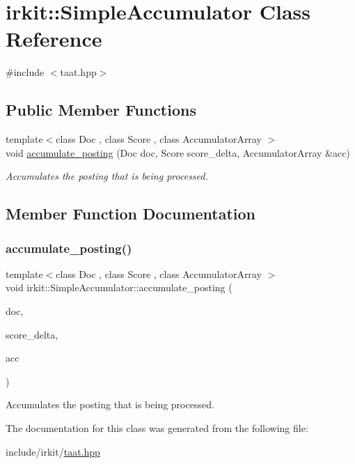 \hypertarget{classirkit_1_1SimpleAccumulator}{}\section{irkit\+:\+:Simple\+Accumulator Class Reference}
\label{classirkit_1_1SimpleAccumulator}


{\ttfamily \#include $<$taat.\+hpp$>$}

\subsection*{Public Member Functions}
\begin{DoxyCompactItemize}
\item 
{\footnotesize template$<$class Doc , class Score , class Accumulator\+Array $>$ }\\void \mbox{\hyperlink{classirkit_1_1SimpleAccumulator_af747d80dbebe394e3ebe920afeeac810}{accumulate\+\_\+posting}} (Doc doc, Score score\+\_\+delta, Accumulator\+Array \&acc)
\begin{DoxyCompactList}\small\item\em Accumulates the posting that is being processed. \end{DoxyCompactList}\end{DoxyCompactItemize}


\subsection{Member Function Documentation}
\mbox{\label{classirkit_1_1SimpleAccumulator_af747d80dbebe394e3ebe920afeeac810}} 
\subsubsection{\texorpdfstring{accumulate\+\_\+posting()}{accumulate\_posting()}}
{\footnotesize\ttfamily template$<$class Doc , class Score , class Accumulator\+Array $>$ \\
void irkit\+::\+Simple\+Accumulator\+::accumulate\+\_\+posting (\begin{DoxyParamCaption}\item[{Doc}]{doc,  }\item[{Score}]{score\+\_\+delta,  }\item[{Accumulator\+Array \&}]{acc }\end{DoxyParamCaption})\hspace{0.3cm}{\ttfamily [inline]}}



Accumulates the posting that is being processed. 



The documentation for this class was generated from the following file\+:\begin{DoxyCompactItemize}
\item 
include/irkit/\mbox{\hyperlink{taat_8hpp}{taat.\+hpp}}\end{DoxyCompactItemize}
